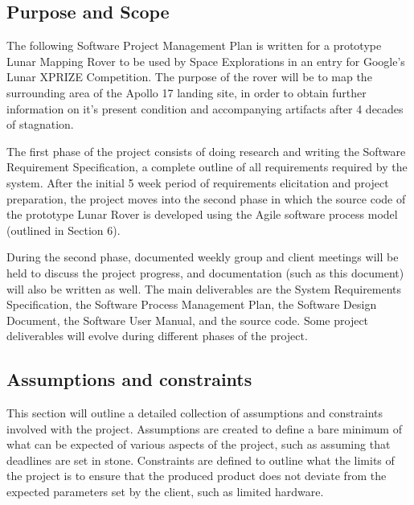\documentclass{article}
\begin{document}
\subsection{Purpose and Scope}
\begin{adjustwidth}{1em}{0pt}
The following Software Project Management Plan  is written for a prototype Lunar Mapping Rover to be used by Space Explorations in an entry for Google's Lunar XPRIZE Competition. The purpose of the rover will be to map the surrounding area of the Apollo 17 landing site, in order to obtain further information on it's present condition and accompanying artifacts after 4 decades of stagnation.

The first phase of the project consists of doing research and writing the Software Requirement Specification, a complete outline of all requirements required by the system. After the initial 5 week period of requirements elicitation and project preparation, the project moves into the second phase in which the source code of the prototype Lunar Rover is developed using the Agile software process model (outlined in Section 6).

During the second phase, documented weekly group and client meetings will be held to discuss the project progress, and documentation (such as this document) will also be written as well. The main deliverables are the System Requirements Specification, the Software Process Management Plan, the Software Design Document, the Software User Manual, and the source code. Some project deliverables will evolve during different phases of the project.
\end{adjustwidth}

\subsection{Assumptions and constraints}
\begin{adjustwidth}{1em}{0pt}
This section will outline a detailed collection of assumptions and constraints involved with the project. Assumptions are created to define a bare minimum of what can be expected of various aspects of the project, such as assuming that deadlines are set in stone. Constraints are defined to outline what the limits of the project is to ensure that the produced product does not deviate from the expected parameters set by the client, such as limited hardware.
\end{adjustwidth}
\end{document}
